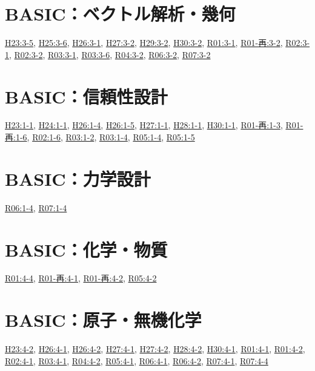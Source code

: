 \section{BASIC：ベクトル解析・幾何}
\hyperref[q:h23-reg-basic-3-5]{H23:3-5}, \hyperref[q:h25-reg-basic-3-6]{H25:3-6}, \hyperref[q:h26-reg-basic-3-1]{H26:3-1}, \hyperref[q:h27-reg-basic-3-2]{H27:3-2}, \hyperref[q:h29-reg-basic-3-2]{H29:3-2}, \hyperref[q:h30-reg-basic-3-2]{H30:3-2}, \hyperref[q:r01-reg-basic-3-1]{R01:3-1}, \hyperref[q:r01-ret-basic-3-2]{R01-再:3-2}, \hyperref[q:r02-reg-basic-3-1]{R02:3-1}, \hyperref[q:r02-reg-basic-3-2]{R02:3-2}, \hyperref[q:r03-reg-basic-3-1]{R03:3-1}, \hyperref[q:r03-reg-basic-3-6]{R03:3-6}, \hyperref[q:r04-reg-basic-3-2]{R04:3-2}, \hyperref[q:r06-reg-basic-3-2]{R06:3-2}, \hyperref[q:r07-reg-basic-3-2]{R07:3-2}
\section{BASIC：信頼性設計}
\hyperref[q:h23-reg-basic-1-1]{H23:1-1}, \hyperref[q:h24-reg-basic-1-1]{H24:1-1}, \hyperref[q:h26-reg-basic-1-4]{H26:1-4}, \hyperref[q:h26-reg-basic-1-5]{H26:1-5}, \hyperref[q:h27-reg-basic-1-1]{H27:1-1}, \hyperref[q:h28-reg-basic-1-1]{H28:1-1}, \hyperref[q:h30-reg-basic-1-1]{H30:1-1}, \hyperref[q:r01-ret-basic-1-3]{R01-再:1-3}, \hyperref[q:r01-ret-basic-1-6]{R01-再:1-6}, \hyperref[q:r02-reg-basic-1-6]{R02:1-6}, \hyperref[q:r03-reg-basic-1-2]{R03:1-2}, \hyperref[q:r03-reg-basic-1-4]{R03:1-4}, \hyperref[q:r05-reg-basic-1-4]{R05:1-4}, \hyperref[q:r05-reg-basic-1-5]{R05:1-5}
\section{BASIC：力学設計}
\hyperref[q:r06-reg-basic-1-4]{R06:1-4}, \hyperref[q:r07-reg-basic-1-4]{R07:1-4}
\section{BASIC：化学・物質}
\hyperref[q:r01-reg-basic-4-4]{R01:4-4}, \hyperref[q:r01-ret-basic-4-1]{R01-再:4-1}, \hyperref[q:r01-ret-basic-4-2]{R01-再:4-2}, \hyperref[q:r05-reg-basic-4-2]{R05:4-2}
\section{BASIC：原子・無機化学}
\hyperref[q:h23-reg-basic-4-2]{H23:4-2}, \hyperref[q:h26-reg-basic-4-1]{H26:4-1}, \hyperref[q:h26-reg-basic-4-2]{H26:4-2}, \hyperref[q:h27-reg-basic-4-1]{H27:4-1}, \hyperref[q:h27-reg-basic-4-2]{H27:4-2}, \hyperref[q:h28-reg-basic-4-2]{H28:4-2}, \hyperref[q:h30-reg-basic-4-1]{H30:4-1}, \hyperref[q:r01-reg-basic-4-1]{R01:4-1}, \hyperref[q:r01-reg-basic-4-2]{R01:4-2}, \hyperref[q:r02-reg-basic-4-1]{R02:4-1}, \hyperref[q:r03-reg-basic-4-1]{R03:4-1}, \hyperref[q:r04-reg-basic-4-2]{R04:4-2}, \hyperref[q:r05-reg-basic-4-1]{R05:4-1}, \hyperref[q:r06-reg-basic-4-1]{R06:4-1}, \hyperref[q:r06-reg-basic-4-2]{R06:4-2}, \hyperref[q:r07-reg-basic-4-1]{R07:4-1}, \hyperref[q:r07-reg-basic-4-4]{R07:4-4}
